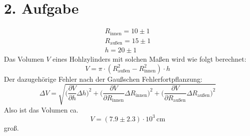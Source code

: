 \documentclass[titlepage = firstcover]{scrartcl}
\begin{document}
    \section*{2. Aufgabe}
        \begin{align*}
            R_\text{innen} = 10 \pm 1 \\
            R_\text{außen} = 15 \pm 1 \\
            h = 20 \pm 1           
        \end{align*}
        Das Volumen $V$ eines Hohlzylinders mit solchen Maßen wird wie folgt berechnet:
        \begin{equation*}
            V = \pi \cdot (R_\text{außen}^2 - R_\text{innen}^2) \cdot h
        \end{equation*}
        Der dazugehörige Fehler nach der Gaußschen Fehlerfortpflanzung:
        \begin{equation*}
            \Delta V = \sqrt{\biggl(\frac{\partial V}{\partial h} \Delta h \biggr)^2 + \biggl(\frac{\partial V}{\partial R_\text{innen}} \Delta R_\text{innen} \biggr)^2 + \biggl(\frac{\partial V}{\partial R_\text{außen}} \Delta R_\text{außen} \biggr)^2}
        \end{equation*}
        Also ist das Volumen ca.
        \begin{equation*}
            V = (7.9 \pm 2.3) \cdot 10^3 \, \mathrm{cm}
        \end{equation*}
        groß.
\end{document}

